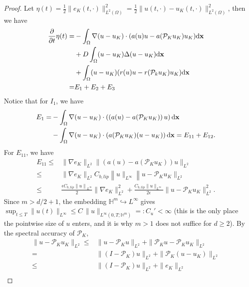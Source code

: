 \documentclass[a4paper,fleqn]{cas-sc}
\theoremstyle{definition}
\theoremstyle{remark}
\begin{document}
\begin{proof}
    Let $\eta(t) = \frac{1}{2}\|e_K(t,\cdot)\|^2_{L^2(\Omega)}  = \frac{1}{2}\|u(t,\cdot)- u_K(t,\cdot)\|^2_{L^2(\Omega)} $, then we have 
    \begin{equation}
        \begin{aligned}
    \frac{\partial}{\partial t} \eta(t)
        = & -\int_\Omega \nabla (u-u_K)\cdot (a(u)u - a(\mathcal P_K u_K )u_K )\mathrm{d} \mathbf{x} \\
        & + D\int_\Omega (u-u_K)  \Delta (u -  u_K  )\mathrm{d} \mathbf{x} \\
        & + \int_\Omega (u-u_K)  (r(u)u - r(\mathcal P_k  u_K ) u_K) \mathrm{d} \mathbf{x}  \\
        = &  E_1 + E_2 + E_3
        \end{aligned}
    \end{equation}
Notice that for $I_1$, we have
\[
\begin{aligned}
    E_1 =& -\int_\Omega \nabla(u-u_K) \cdot \left(\left(a(u) - a(\mathcal P_K u_K )\right)u\right) \mathrm{d} \mathbf{x}\\
    &- \int_\Omega \nabla(u-u_K) \cdot \left(a(\mathcal P_K u_K )(u  - u_K )\right)\mathrm{d} \mathbf{x} = E_{11}+ E_{12}.\\
\end{aligned}
\]
For $E_{11}$, we have 
\[
\begin{aligned}
E_{11} \leq & \|\nabla e_K \|_{L^2} \|\left(a(u) - a(\mathcal P_K u_K )\right) u \|_{L^2}\\
 \leq& \|\nabla e_K \|_{L^2} C_{b,lip}\left\|u\|_{L^\infty}\right\|u - \mathcal P_K u_K \|_{L^2}\\
\leq&  \frac{\epsilon C_{b,lip} \left\|u\right\|_{L^\infty} }{2} \|\nabla e_K \|_{L^2}^2 
+\frac{C_{b,lip}\|u\|_{L^\infty}}{2\epsilon} \|u - \mathcal P_K u_K\|_{L^2}^2.
\end{aligned}
\]
Since $m>d/2+1$, the embedding $\mathbb H^m\hookrightarrow L^\infty$ gives
$\sup_{t\le T}\|u(t)\|_{L^\infty}\le C\,\|u\|_{L^\infty(0,T;\mathbb H^m)}=:C_u'<\infty$
(this is the only place the pointwise size of $u$ enters, and it is why $m>1$ does not
suffice for $d\ge2$). By the spectral accuracy of $\mathcal P_K$,
\[
\begin{aligned}
\|u - \mathcal P_K u_K\|_{L^2} \leq& \|u - \mathcal P_K u\|_{L^2} + \|\mathcal P_K u - \mathcal P_K u_K\|_{L^2}\\
=& \|(I - \mathcal P_K) u\|_{L^2} + \|\mathcal  P_K (u - u_K)\|_{L^2} \\
\leq &\|(I - \mathcal P_K) u\|_{L^2} + \|e_K\|_{L^2}\\

\end{aligned}\]
\end{proof}
\end{document}
